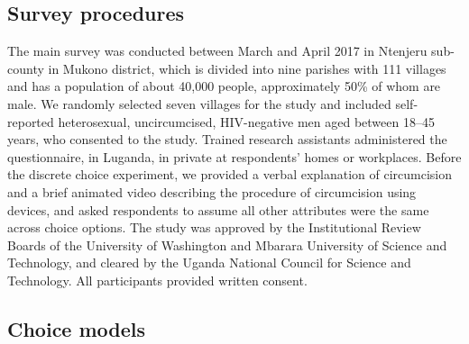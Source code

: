 \documentclass[11pt]{article}
\numberwithin{equation}{section}\numberwithin{figure}{section}\numberwithin{table}{section}
\begin{document}
\subsection{Survey procedures}
The main survey was conducted between March and April 2017 in Ntenjeru sub-county in Mukono district, which is divided into nine parishes with 111 villages and has a population of about 40,000 people, approximately 50\% of whom are male.\cite{RN270} We randomly selected seven villages for the study and included self-reported heterosexual, uncircumcised, HIV-negative men aged between 18--45 years, who consented to the study. Trained research assistants administered the questionnaire, in Luganda, in private at respondents' homes or workplaces. Before the discrete choice experiment, we provided a verbal explanation of circumcision and a brief animated video describing the procedure of circumcision using devices, and asked respondents to assume all other attributes were the same across choice options. The study was approved by the Institutional Review Boards of the University of Washington and Mbarara University of Science and Technology, and cleared by the Uganda National Council for Science and Technology. All participants provided written consent.

\subsection{Choice models}
\end{document}
